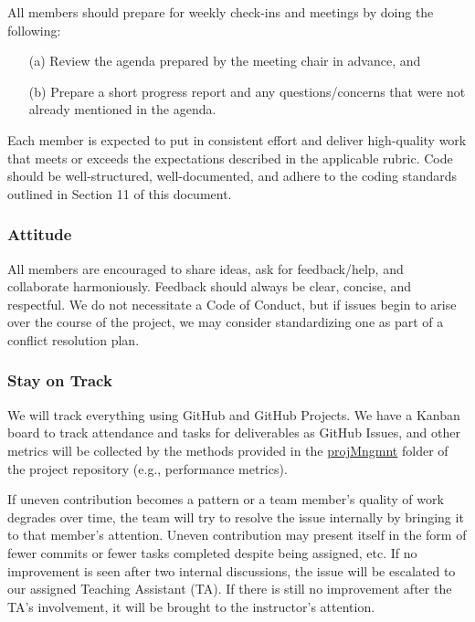 \documentclass{article}
\begin{document}
All members should prepare for weekly check-ins and meetings by doing the
following:

\begin{itemize}
  \item[(a)] Review the agenda prepared by the meeting chair in advance, and
  \item[(b)] Prepare a short progress report and any questions/concerns that
  were not already mentioned in the agenda.
\end{itemize}

\noindent Each member is expected to put in consistent effort and deliver
high-quality work that meets or exceeds the expectations described in the
applicable rubric. Code should be well-structured, well-documented, and adhere
to the coding standards outlined in Section 11 of this document.

\subsubsection*{Attitude}

All members are encouraged to share ideas, ask for feedback/help, and
collaborate harmoniously. Feedback should always be clear, concise, and
respectful. We do not necessitate a Code of Conduct, but if issues begin to
arise over the course of the project, we may consider standardizing one as part
of a conflict resolution plan.

\subsubsection*{Stay on Track}

We will track everything using GitHub and GitHub Projects. We have a Kanban
board to track attendance and tasks for deliverables as GitHub Issues, and other
metrics will be collected by the methods provided in the
\href{https://github.com/SumanyaG/Alkalytics/tree/main/docs/projMngmnt}{projMngmnt}
folder of the project repository (e.g., performance metrics).\newline

\noindent If uneven contribution becomes a pattern or a team member’s quality of
work degrades over time, the team will try to resolve the issue internally by
bringing it to that member’s attention. Uneven contribution may present itself
in the form of fewer commits or fewer tasks completed despite being assigned,
etc. If no improvement is seen after two internal discussions, the issue will be
escalated to our assigned Teaching Assistant (TA). If there is still no
improvement after the TA's involvement, it will be brought to the instructor's
attention.
\end{document}
